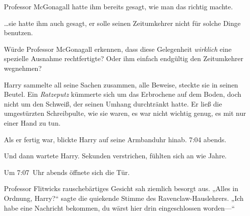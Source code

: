 Professor McGonagall hatte ihm bereits gesagt, wie man das richtig machte.

…sie hatte ihm auch gesagt, er solle seinen Zeitumkehrer nicht für solche Dinge benutzen.

Würde Professor McGonagall erkennen, dass diese Gelegenheit \emph{wirklich} eine spezielle Ausnahme rechtfertigte? Oder ihm einfach endgültig den Zeitumkehrer wegnehmen?

Harry sammelte all seine Sachen zusammen, alle Beweise, steckte sie in seinen Beutel. Ein \emph{Ratzeputz} kümmerte sich um das Erbrochene auf dem Boden, doch nicht um den Schweiß, der seinen Umhang durchtränkt hatte. Er ließ die umgestürzten Schreibpulte, wie sie waren, es war nicht wichtig genug, es mit nur einer Hand zu tun.

Als er fertig war, blickte Harry auf seine Armbanduhr hinab. 7:04 abends.

Und dann wartete Harry. Sekunden verstrichen, fühlten sich an wie Jahre.

Um 7:07~Uhr abends öffnete sich die Tür.

Professor Flitwicks rauschebärtiges Gesicht sah ziemlich besorgt aus. „Alles in Ordnung, Harry?“ sagte die quiekende Stimme des Ravenclaw-Hauslehrers. „Ich habe eine Nachricht bekommen, du wärst hier drin eingeschlossen worden—“

